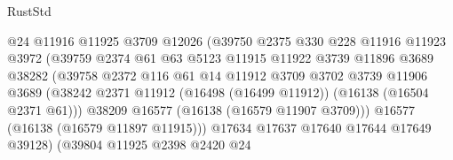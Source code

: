 \begin{lexlean}{RustStd}
\begin{coremodule}
                                    @24
                                    @11916
                                    @11925
                                    @3709
                                    @12026
                                    (@39750
                                      @2375
                                      @330
                                      @228
                                      @11916
                                      @11923
                                      @3972
                                      (@39759
                                        @2374
                                        @61
                                        @63
                                        @5123
                                        @11915
                                        @11922
                                        @3739
                                        @11896
                                        @3689
                                        @38282
                                        (@39758
                                          @2372
                                          @116
                                          @61
                                          @14
                                          @11912
                                          @3709
                                          @3702
                                          @3739
                                          @11906
                                          @3689
                                          (@38242
                                            @2371
                                            @11912
                                            (@16498 (@16499 @11912))
                                            (@16138 (@16504 @2371 @61)))
                                          @38209
                                          @16577
                                          (@16138 (@16579 @11907 @3709)))
                                        @16577
                                        (@16138 (@16579 @11897 @11915)))
                                      @17634
                                      @17637
                                      @17640
                                      @17644
                                      @17649
                                      @39128)
                                    (@39804
                                      @11925
                                      @2398
                                      @2420
                                      @24

\end{coremodule}
\end{lexlean}
